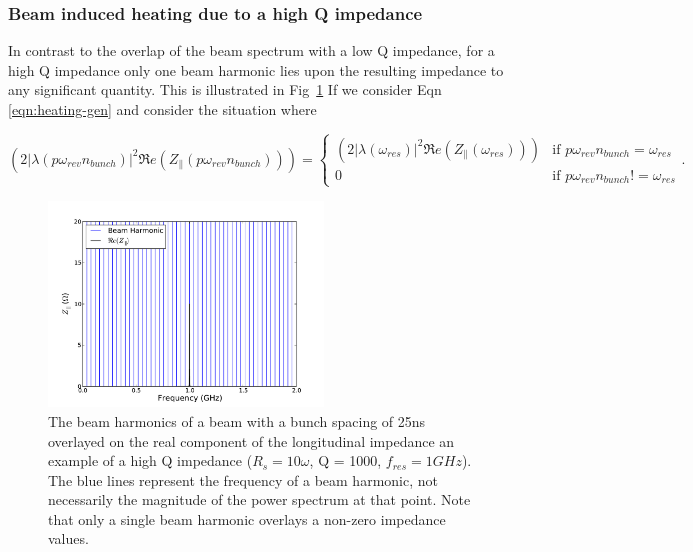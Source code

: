 \subsubsection{Beam induced heating due to a high Q impedance}

In contrast to the overlap of the beam spectrum with a low Q impedance, for a high Q impedance only one beam harmonic lies upon the resulting impedance to any significant quantity. This is illustrated in Fig~\ref{fig:high_q_harmonics} If we consider Eqn \ref{eqn:heating-gen} and consider the situation where

\begin{equation}
\left( 2 \left| \lambda \left(p \omega_{rev}n_{bunch} \right)  \right|^{2}  \Re{}e \left( Z_{\parallel} \left(p \omega_{rev}n_{bunch}\right) \right) \right) = 
\begin{cases}
\left( 2 \left| \lambda \left( \omega_{res} \right)  \right|^{2}  \Re{}e \left( Z_{\parallel} \left( \omega_{res} \right) \right) \right) &\textrm{if $p \omega_{rev} n_{bunch} = \omega_{res}$}\\
0								&\textrm{if $p \omega_{rev} n_{bunch} != \omega_{res}$}
\end{cases}
\label{eqn:single_harmonic_profile}.
\end{equation}

\begin{figure}
\begin{center}
\includegraphics[width=0.65\textwidth]{Wakefields_and_Impedances/figures/high_q_1000_resonance_beam_harmonics.pdf}
\end{center}
\label{fig:high_q_harmonics}
\caption{The beam harmonics of a beam with a bunch spacing of 25ns overlayed on the real component of the longitudinal impedance an example of a high Q impedance ($R_{s}=10\omega$, Q = 1000, $f_{res}=1GHz$). The blue lines represent the frequency of a beam harmonic, not necessarily the magnitude of the power spectrum at that point. Note that only a single beam harmonic overlays a non-zero impedance values.}
\end{figure}

